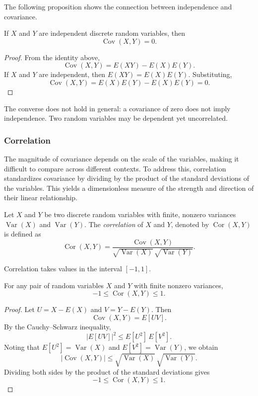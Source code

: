 The following proposition shows the connection between independence and covariance.

\begin{proposition}
If $X$ and $Y$ are independent discrete random variables, then
\[
\operatorname{Cov}(X,Y) = 0.
\]
\end{proposition}
\begin{proof}
From the identity above,
\[
\operatorname{Cov}(X,Y) = E(XY) - E(X)E(Y).
\]
If $X$ and $Y$ are independent, then $E(XY) = E(X)E(Y)$. Substituting,
\[
\operatorname{Cov}(X,Y) = E(X)E(Y) - E(X)E(Y) = 0.
\]
\end{proof}

The converse does not hold in general: a covariance of zero does not imply independence. Two random variables may be dependent yet uncorrelated.


\subsubsection*{Correlation}

The magnitude of covariance depends on the scale of the variables, making it difficult to compare across different contexts. To address this, correlation standardizes covariance by dividing by the product of the standard deviations of the variables. This yields a dimensionless measure of the strength and direction of their linear relationship.

\begin{definition}
Let $X$ and $Y$ be two discrete random variables with finite, nonzero variances $\operatorname{Var}(X)$ and $\operatorname{Var}(Y)$. The \emph{correlation} of $X$ and $Y$, denoted by $\operatorname{Cor}(X,Y)$ is defined as
\[
\operatorname{Cor}(X,Y) = \frac{\operatorname{Cov}(X,Y)}{\sqrt{\operatorname{Var}(X)} \, \sqrt{\operatorname{Var}(Y)}}.
\]
\end{definition}

Correlation takes values in the interval $[-1,1]$. 

\begin{proposition}
For any pair of random variables $X$ and $Y$ with finite nonzero variances,
\[
-1 \leq \operatorname{Cor}(X,Y) \leq 1.
\]
\end{proposition}
\begin{proof}
Let $U = X - E(X)$ and $V = Y - E(Y)$. Then
\[
\operatorname{Cov}(X,Y) = E[UV].
\]
By the Cauchy--Schwarz inequality,
\[
|E[UV]|^2 \leq E[U^2] \, E[V^2].
\]
Noting that $E[U^2] = \operatorname{Var}(X)$ and $E[V^2] = \operatorname{Var}(Y)$, we obtain
\[
|\operatorname{Cov}(X,Y)| \leq \sqrt{\operatorname{Var}(X)} \, \sqrt{\operatorname{Var}(Y)}.
\]
Dividing both sides by the product of the standard deviations gives
\[
-1 \leq \operatorname{Cor}(X,Y) \leq 1.
\]
\end{proof}

